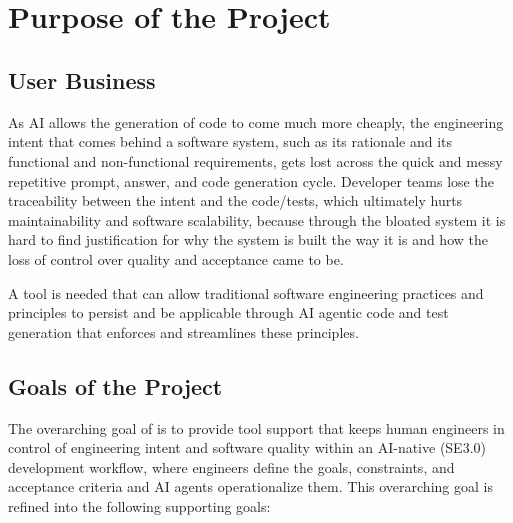 \documentclass[12pt]{article}
\begin{document}
~\\

~\newpage
\section{Purpose of the Project}
\subsection{User Business}

As AI allows the generation of code to come much more cheaply, the engineering
intent that comes behind a software system, such as its rationale and its
functional and non-functional requirements, gets lost across the quick and messy
repetitive prompt, answer, and code generation cycle. Developer teams lose the
traceability between the intent and the code/tests, which ultimately hurts
maintainability and software scalability, because through the bloated system it
is hard to find justification for why the system is built the way it is and how
the loss of control over quality and acceptance came to be.

A tool is needed that can allow traditional software engineering practices and
principles to persist and be applicable through AI agentic code and test
generation that enforces and streamlines these principles.

\subsection{Goals of the Project}

The overarching goal of \progname{} is to provide tool support that keeps human
engineers in control of engineering intent and software quality within an
AI-native (SE3.0) development workflow, where engineers define the goals,
constraints, and acceptance criteria and AI agents operationalize them. This
overarching goal is refined into the following supporting goals:
\end{document}
